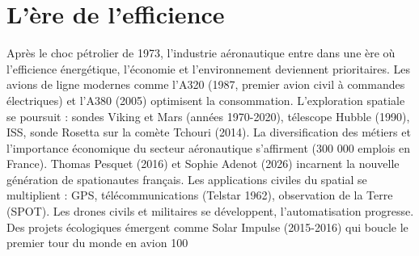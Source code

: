 \section{L'ère de l'efficience}
Après le choc pétrolier de 1973, l'industrie aéronautique entre dans une ère où l'efficience énergétique, l'économie et l'environnement deviennent prioritaires. Les avions de ligne modernes comme l'A320 (1987, premier avion civil à commandes électriques) et l'A380 (2005) optimisent la consommation. L'exploration spatiale se poursuit : sondes Viking et Mars (années 1970-2020), télescope Hubble (1990), ISS, sonde Rosetta sur la comète Tchouri (2014). La diversification des métiers et l'importance économique du secteur aéronautique s'affirment (300 000 emplois en France). Thomas Pesquet (2016) et Sophie Adenot (2026) incarnent la nouvelle génération de spationautes français. Les applications civiles du spatial se multiplient : GPS, télécommunications (Telstar 1962), observation de la Terre (SPOT). Les drones civils et militaires se développent, l'automatisation progresse. Des projets écologiques émergent comme Solar Impulse (2015-2016) qui boucle le premier tour du monde en avion 100%
